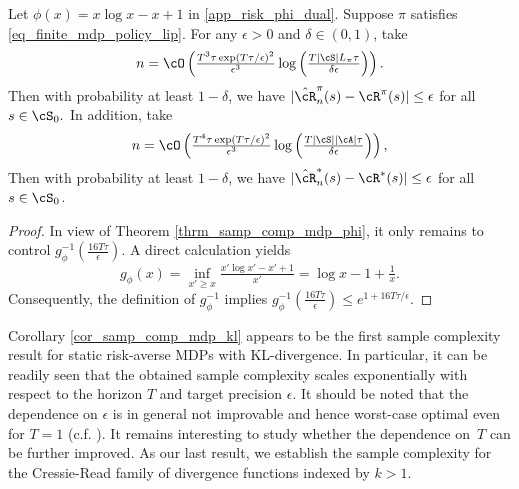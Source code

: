 \documentclass[9pt]{article}
\numberwithin{equation}{section}
\renewcommand{\frac}[2]{\tfrac{#1}{#2}}
\begin{document}
\begin{corollary} \label{cor_samp_comp_mdp_kl}
Let $\phi(x) = x\log x - x + 1$ in \eqref{app_risk_phi_dual}.
    Suppose $\pi$ satisfies \eqref{eq_finite_mdp_policy_lip}. For any $\epsilon > 0$ and $\delta \in (0,1)$, take
    \begin{align*}
    n = \cO \left(\tfrac{T^3 \tau \exp(T\tau/\epsilon)^2}{\epsilon^3} \log \left(\tfrac{T |\cS| L_\pi \tau}{\delta \epsilon} \right)\right).
    \end{align*}
 Then with probability at least $1-\delta$, we have $|\hat{\cR}_n^\pi(s) - \cR^{\pi}(s)| \leq \epsilon$ for all $s \in \cS_0.$
    In addition, take
    \begin{align*}
    n = \cO \left(\tfrac{T^4 \tau \exp(T\tau/\epsilon)^2}{\epsilon^3} \log \left(\tfrac{T |\cS| |\cA| \tau}{\delta \epsilon} \right)\right), 
    \end{align*}
    Then with probability at least $1-\delta$, we have  $| \hat{\cR}^*_n(s)  -\cR^*(s) | \leq \epsilon $ for all $ s \in \cS_0$.
\end{corollary}
\begin{proof}
    In view of Theorem \ref{thrm_samp_comp_mdp_phi}, it only remains to control $g_\phi^{-1}(\frac{16T \tau}{\epsilon})$. A direct calculation yields
    $$g_\phi(x) = \inf_{x' \geq x} \tfrac{x' \log x' - x' + 1}{x'} = \log x - 1 + \tfrac{1}{x}.$$
    Consequently, the definition of $g_\phi^{-1}$ implies $g_\phi^{-1}(\frac{16T \tau }{\epsilon}) \leq e^{1 + 16T\tau/\epsilon}$.
\end{proof}

Corollary \ref{cor_samp_comp_mdp_kl} appears to be the first sample complexity result for static risk-averse MDPs with KL-divergence. 
In particular, it can be readily seen that the obtained sample complexity scales exponentially with respect to the horizon $T$ and target precision $\epsilon$. 
It should be noted that the dependence on $\epsilon$ is in general not improvable and hence worst-case optimal even for $T=1$ (c.f. \cite{li2026sample}). 
It remains interesting to study whether the dependence on~$T$ can be further improved.
As our last result, we establish the sample complexity for the Cressie-Read family of divergence functions indexed by $k > 1$. 
\end{document}

